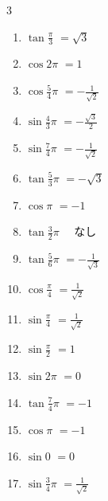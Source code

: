 \begin{multicols}{3}
\begin{enumerate}
  \item $\displaystyle \tan{\frac{\pi}{3}}$
        $\displaystyle =\sqrt{3}$

  \item $\displaystyle \cos{2\pi}$
        $\displaystyle =1$

\columnbreak %

  \item $\displaystyle \cos{\frac{5}{4}\pi}$
        $\displaystyle =-\frac{1}{\sqrt{2}}$

  \item $\displaystyle \sin{\frac{4}{3}\pi}$
        $\displaystyle =-\frac{\sqrt{3}}{2}$

  \item $\displaystyle \sin{\frac{7}{4}\pi}$
        $\displaystyle =-\frac{1}{\sqrt{2}}$

  \item $\displaystyle \tan{\frac{5}{3}\pi}$
        $\displaystyle =-\sqrt{3}$

  \item $\displaystyle \cos{\pi}$
        $\displaystyle =-1$

  \item $\displaystyle \tan{\frac{3}{2}\pi}$
        $\displaystyle \quad なし$

  \item $\displaystyle \tan{\frac{5}{6}\pi}$
        $\displaystyle =-\frac{1}{\sqrt{3}}$

  \item $\displaystyle \cos{\frac{\pi}{4}}$
        $\displaystyle =\frac{1}{\sqrt{2}}$

  \item $\displaystyle \sin{\frac{\pi}{4}}$
        $\displaystyle =\frac{1}{\sqrt{2}}$

  \item $\displaystyle \sin{\frac{\pi}{2}}$
        $\displaystyle =1$

  \item $\displaystyle \sin{2\pi}$
        $\displaystyle =0$

  \item $\displaystyle \tan{\frac{7}{4}\pi}$
        $\displaystyle =-1$

  \item $\displaystyle \cos{\pi}$
        $\displaystyle =-1$

  \item $\displaystyle \sin{0}$
        $\displaystyle =0$

  \item $\displaystyle \sin{\frac{3}{4}\pi}$
        $\displaystyle =\frac{1}{\sqrt{2}}$


\end{enumerate}
\end{multicols}

